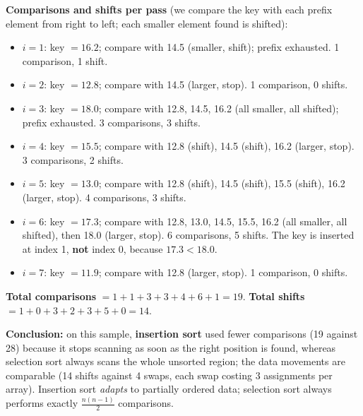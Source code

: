 \documentclass[11pt]{article}
\begin{document}
\begin{exemplebox}
\noindent\textbf{Comparisons and shifts per pass} (we compare the key with each prefix element from right to left; each smaller element found is shifted):
\begin{itemize}
    \item $i=1$: key $=16.2$; compare with 14.5 (smaller, shift); prefix exhausted. 1 comparison, 1 shift.
    \item $i=2$: key $=12.8$; compare with 14.5 (larger, stop). 1 comparison, 0 shifts.
    \item $i=3$: key $=18.0$; compare with 12.8, 14.5, 16.2 (all smaller, all shifted); prefix exhausted. 3 comparisons, 3 shifts.
    \item $i=4$: key $=15.5$; compare with 12.8 (shift), 14.5 (shift), 16.2 (larger, stop). 3 comparisons, 2 shifts.
    \item $i=5$: key $=13.0$; compare with 12.8 (shift), 14.5 (shift), 15.5 (shift), 16.2 (larger, stop). 4 comparisons, 3 shifts.
    \item $i=6$: key $=17.3$; compare with 12.8, 13.0, 14.5, 15.5, 16.2 (all smaller, all shifted), then 18.0 (larger, stop). 6 comparisons, 5 shifts. The key is inserted at index 1, \textbf{not} index 0, because $17.3 < 18.0$.
    \item $i=7$: key $=11.9$; compare with 12.8 (larger, stop). 1 comparison, 0 shifts.
\end{itemize}

\noindent\textbf{Total comparisons} $= 1+1+3+3+4+6+1 = 19$. \textbf{Total shifts} $= 1+0+3+2+3+5+0 = 14$.

\medskip
\noindent\textbf{Conclusion:} on this sample, \textbf{insertion sort} used fewer comparisons (19 against 28) because it stops scanning as soon as the right position is found, whereas selection sort always scans the whole unsorted region; the data movements are comparable (14 shifts against 4 swaps, each swap costing 3 assignments per array). Insertion sort \emph{adapts} to partially ordered data; selection sort always performs exactly $\frac{n(n-1)}{2}$ comparisons.
\end{exemplebox}
\end{document}
